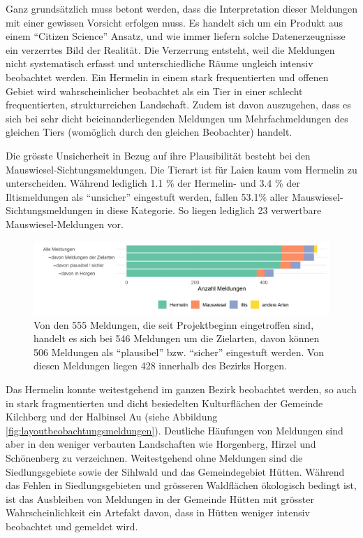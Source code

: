 \documentclass[
  oneside]{scrbook}
\begin{document}
Ganz grundsätzlich muss betont werden, dass die Interpretation dieser Meldungen mit einer gewissen Vorsicht erfolgen muss. Es handelt sich um ein Produkt aus einem ``Citizen Science'' Ansatz, und wie immer liefern solche Datenerzeugnisse ein verzerrtes Bild der Realität. Die Verzerrung entsteht, weil die Meldungen nicht systematisch erfasst und unterschiedliche Räume ungleich intensiv beobachtet werden. Ein Hermelin in einem stark frequentierten und offenen Gebiet wird wahrscheinlicher beobachtet als ein Tier in einer schlecht frequentierten, strukturreichen Landschaft. Zudem ist davon auszugehen, dass es sich bei sehr dicht beieinanderliegenden Meldungen um Mehrfachmeldungen des gleichen Tiers (womöglich durch den gleichen Beobachter) handelt.

Die grösste Unsicherheit in Bezug auf ihre Plausibilität besteht bei den Mauswiesel-Sichtungsmeldungen. Die Tierart ist für Laien kaum vom Hermelin zu unterscheiden. Während lediglich 1.1 \% der Hermelin- und 3.4 \% der Iltismeldungen als ``unsicher'' eingestuft werden, fallen 53.1\% aller Mauswiesel-Sichtungsmeldungen in diese Kategorie. So liegen lediglich 23 verwertbare Mauswiesel-Meldungen vor.



\begin{figure}
\includegraphics[width=1\linewidth]{images/beobachtungsmeldungen_filter} \caption{Von den 555 Meldungen, die seit Projektbeginn eingetroffen sind, handelt es sich bei 546 Meldungen um die Zielarten, davon können 506 Meldungen als ``plausibel'' bzw. ``sicher'' eingestuft werden. Von diesen Meldungen liegen 428 innerhalb des Bezirks Horgen.}\label{fig:beobachtungsmeldungenfilter}
\end{figure}

Das Hermelin konnte weitestgehend im ganzen Bezirk beobachtet werden, so auch in stark fragmentierten und dicht besiedelten Kulturflächen der Gemeinde Kilchberg und der Halbinsel Au (siehe Abbildung \ref{fig:layoutbeobachtungsmeldungen}). Deutliche Häufungen von Meldungen sind aber in den weniger verbauten Landschaften wie Horgenberg, Hirzel und Schönenberg zu verzeichnen. Weitestgehend ohne Meldungen sind die Siedlungsgebiete sowie der Sihlwald und das Gemeindegebiet Hütten. Während das Fehlen in Siedlungsgebieten und grösseren Waldflächen ökologisch bedingt ist, ist das Ausbleiben von Meldungen in der Gemeinde Hütten mit grösster Wahrscheinlichkeit ein Artefakt davon, dass in Hütten weniger intensiv beobachtet und gemeldet wird.
\end{document}
